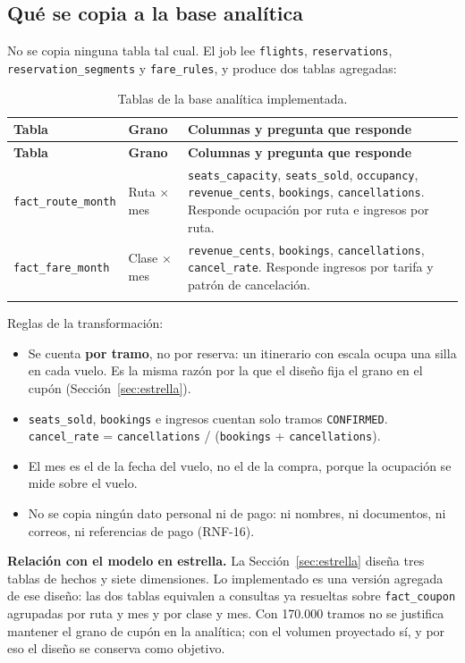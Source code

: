 \documentclass[10pt,letterpaper]{article}
\begin{document}
\subsection{Qué se copia a la base analítica}
No se copia ninguna tabla tal cual. El job lee \texttt{flights}, \texttt{reservations}, \texttt{reservation\_segments} y \texttt{fare\_rules}, y produce dos tablas agregadas:

\begin{longtable}{@{}L{3.6cm} L{2.4cm} L{9.6cm}@{}}
\toprule \textbf{Tabla} & \textbf{Grano} & \textbf{Columnas y pregunta que responde} \\ \midrule \endfirsthead
\toprule \textbf{Tabla} & \textbf{Grano} & \textbf{Columnas y pregunta que responde} \\ \midrule \endhead
\texttt{fact\_route\_month} & Ruta $\times$ mes & \texttt{seats\_capacity}, \texttt{seats\_sold}, \texttt{occupancy}, \texttt{revenue\_cents}, \texttt{bookings}, \texttt{cancellations}. Responde ocupación por ruta e ingresos por ruta. \\
\texttt{fact\_fare\_month} & Clase $\times$ mes & \texttt{revenue\_cents}, \texttt{bookings}, \texttt{cancellations}, \texttt{cancel\_rate}. Responde ingresos por tarifa y patrón de cancelación. \\
\bottomrule
\caption{Tablas de la base analítica implementada.}
\end{longtable}

Reglas de la transformación:
\begin{itemize}
  \item Se cuenta \textbf{por tramo}, no por reserva: un itinerario con escala ocupa una silla en cada vuelo. Es la misma razón por la que el diseño fija el grano en el cupón (Sección~\ref{sec:estrella}).
  \item \texttt{seats\_sold}, \texttt{bookings} e ingresos cuentan solo tramos \texttt{CONFIRMED}. \texttt{cancel\_rate} = \texttt{cancellations} / (\texttt{bookings} + \texttt{cancellations}).
  \item El mes es el de la fecha del vuelo, no el de la compra, porque la ocupación se mide sobre el vuelo.
  \item No se copia ningún dato personal ni de pago: ni nombres, ni documentos, ni correos, ni referencias de pago (RNF-16).
\end{itemize}

\textbf{Relación con el modelo en estrella.} La Sección~\ref{sec:estrella} diseña tres tablas de hechos y siete dimensiones. Lo implementado es una versión agregada de ese diseño: las dos tablas equivalen a consultas ya resueltas sobre \texttt{fact\_coupon} agrupadas por ruta y mes y por clase y mes. Con 170.000 tramos no se justifica mantener el grano de cupón en la analítica; con el volumen proyectado sí, y por eso el diseño se conserva como objetivo.
\end{document}
